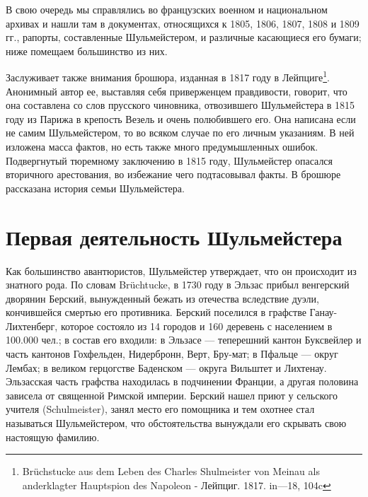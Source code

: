 \documentclass[
  oneside,
  12pt,
  titlepage]{book}
\begin{document}
В свою очередь мы справлялись во французских военном и национальном архивах и нашли там в документах, относящихся к 1805, 1806, 1807, 1808 и 1809 гг., рапорты, составленные Шульмейстером, и различные касающиеся его бумаги; ниже помещаем большинство из них.

Заслуживает также внимания брошюра, изданная в 1817 году в Лейпциге\footnote{Brüchstucke aus dem Leben des Charles Shulmeister von Meinau als anderklagter Hauptspion des Napoleon - Лейпциг. 1817. in---18, 104c}. Анонимный автор ее, выставляя себя приверженцем правдивости, говорит, что она составлена со слов прусского чиновника, отвозившего Шульмейстера в 1815 году из Парижа в крепость Везель и очень полюбившего его. Она написана если не самим Шульмейстером, то во всяком случае по его личным указаниям. В ней изложена масса фактов, но есть также много предумышленных ошибок. Подвергнутый тюремному заключению в 1815 году, Шульмейстер опасался вторичного арестования, во избежание чего подтасовывал факты. В брошюре рассказана история семьи Шульмейстера.

\hypertarget{ux43fux435ux440ux432ux430ux44f-ux434ux435ux44fux442ux435ux43bux44cux43dux43eux441ux442ux44c-ux448ux443ux43bux44cux43cux435ux439ux441ux442ux435ux440ux430}{%
\chapter{Первая деятельность Шульмейстера}\label{ux43fux435ux440ux432ux430ux44f-ux434ux435ux44fux442ux435ux43bux44cux43dux43eux441ux442ux44c-ux448ux443ux43bux44cux43cux435ux439ux441ux442ux435ux440ux430}}

Как большинство авантюристов, Шульмейстер утверждает, что он происходит из знатного рода. По словам Brüchtucke, в 1730 году в Эльзас прибыл венгерский дворянин Берский, вынужденный бежать из отечества вследствие дуэли, кончившейся смертью его противника. Берский поселился в графстве Ганау-Лихтенберг, которое состояло из 14 городов и 160 деревень с населением в 100.000 чел.; в состав его входили: в Эльзасе --- теперешний кантон Буксвейлер и часть кантонов Гохфельден, Нидербронн, Верт, Бру-мат; в Пфальце --- округ Лембах; в великом герцогстве Баденском --- округа Вильштет и Лихтенау. Эльзасская часть графства находилась в подчинении Франции, а другая половина зависела от священной Римской империи. Берский нашел приют у сельского учителя (Schulmeister), занял место его помощника и тем охотнее стал называться Шульмейстером, что обстоятельства вынуждали его скрывать свою настоящую фамилию.
\end{document}

